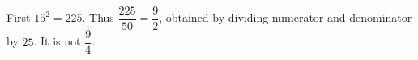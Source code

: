 First $15^2=225$. Thus $\dfrac{225}{50}=\boxed{\dfrac{9}{2}}$, obtained by dividing numerator and denominator by $25$. It is not $\dfrac{9}{4}$.
